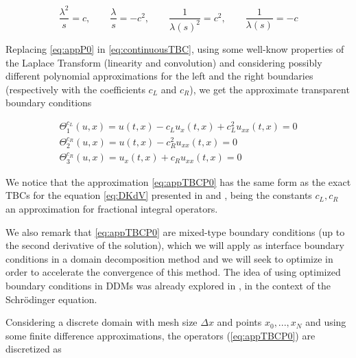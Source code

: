 \begin{equation}
	\label{eq:appP0}
	\frac{\lambda^2}{s}  = c, \qquad
	\frac{\lambda}{s}  = -c^2, \qquad
	\frac{1}{\lambda(s)^2}  = c^2, \qquad 
	 \frac{1}{\lambda(s)}  = -c 
\end{equation}

\indent Replacing \eqref{eq:appP0} in \eqref{eq:continuousTBC}, using some well-know properties of the Laplace Transform (linearity and convolution) and considering possibly different polynomial approximations for the left and the right boundaries (respectively with the coefficients $c_L$ and $c_R$), we get the approximate transparent boundary conditions


\begin{equation}
  \label{eq:appTBCP0}
    \begin{gathered}
        \Theta_1^{c_L}(u,x) = u(t,x) - c_L u_x(t,x)  + c_L^2  u_{xx}(t,x) = 0 \\
        \Theta_2^{c_R}(u,x) =  u(t,x) - c_R^2    u_{xx}(t,x) = 0\\
        \Theta_3^{c_R} (u,x)= u_x(t,x) + c_R u_{xx}(t,x)  = 0
    \end{gathered}
\end{equation}

\indent We notice that the approximation \eqref{eq:appTBCP0} has the same form as the exact TBCs for the equation \eqref{eq:DKdV} presented in \cite{zheng2008} and \cite{besse2015}, being the constants $c_L,c_R$ an approximation for fractional integral operators. 

\indent We also remark that \eqref{eq:appTBCP0} are mixed-type boundary conditions (up to the second derivative of the solution), which we will apply as interface boundary conditions in a domain decomposition method and we will seek to optimize in order to accelerate the convergence of this method. The idea of using optimized boundary conditions in DDMs was already explored in \cite{Halpern2008}, in the context of the Schrödinger equation.

\indent Considering a discrete domain with mesh size $\Delta x$ and points $x_0, ..., x_N$ and using some finite difference approximations, the operators (\ref{eq:appTBCP0}) are discretized as

